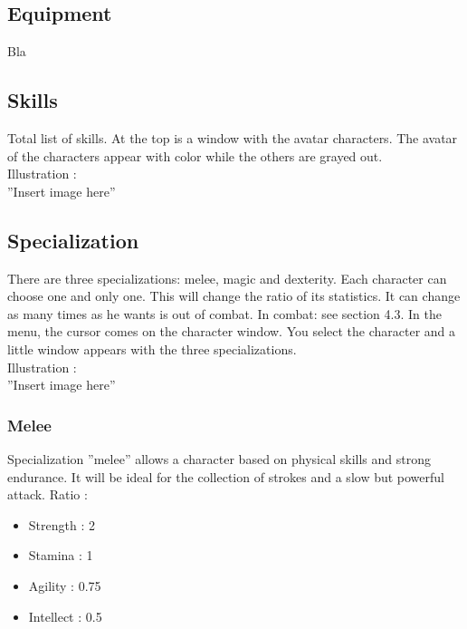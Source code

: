 \documentclass[a4paper,12pt]{book}
\begin{document}
\subsection{Equipment}
Bla
\subsection{Skills}
Total list of skills. At the top is a window with the avatar characters. The avatar of the characters appear with color while the others are grayed out. \\ Illustration : \\ ''Insert image here''
\subsection{Specialization}
There are three specializations: melee, magic and dexterity. Each character can choose one and only one. This will change the ratio of its statistics. It can change as many times as he wants is out of combat. In combat: see section 4.3.
In the menu, the cursor comes on the character window. You select the character and a little window appears with the three specializations. \\ Illustration : \\ ''Insert image here''
\subsubsection{Melee}
Specialization ''melee'' allows a character based on physical skills and strong endurance. It will be ideal for the collection of strokes and a slow but powerful attack. \newpage
Ratio :
\begin{itemize}
\item Strength : 2
\item Stamina : 1
\item Agility : 0.75
\item Intellect : 0.5
\end{itemize}
\end{document}

